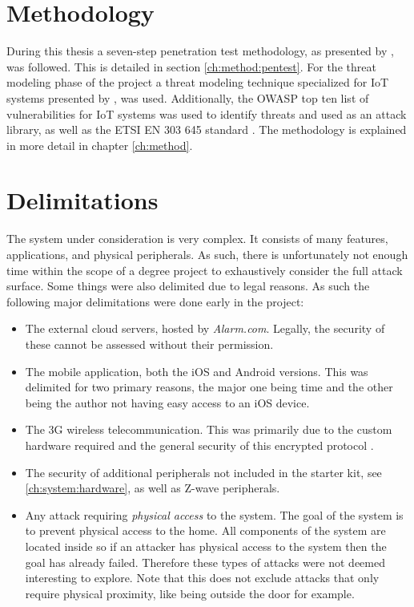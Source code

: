 \section{Methodology} \label{ch:intro:methodology}
During this thesis a seven-step penetration test methodology, as presented by \citeauthor{weidman2014} \cite{weidman2014}, was followed. This is detailed in section \ref{ch:method:pentest}. For the threat modeling phase of the project a threat modeling technique specialized for IoT systems presented by \citeauthor{guzman2017iot} \cite{guzman2017iot}, was used. Additionally, the OWASP top ten list of vulnerabilities for IoT systems \cite{owasp-iot-top10} was used to identify threats and used as an attack library, as well as the ETSI EN 303 645 standard \cite{etsi-iot-standard}. The methodology is explained in more detail in chapter \ref{ch:method}.

\section{Delimitations} \label{ch:intro:delimitations}
The system under consideration is very complex. It consists of many features, applications, and physical peripherals. As such, there is unfortunately not enough time within the scope of a degree project to exhaustively consider the full attack surface. Some things were also delimited due to legal reasons. As such the following major delimitations were done early in the project:
\begin{itemize}
    \item The external cloud servers, hosted by \textit{Alarm.com}. Legally, the security of these cannot be assessed without their permission.
    \item The mobile application, both the iOS and Android versions. This was delimited for two primary reasons, the major one being time and the other being the author not having easy access to an iOS device.
    \item The 3G wireless telecommunication. This was primarily due to the custom hardware required and the general security of this encrypted protocol \citeauthor{koien2003security}.
    \item The security of additional peripherals not included in the starter kit, see \ref{ch:system:hardware}, as well as Z-wave peripherals.
    \item Any attack requiring \textit{physical access} to the system. The goal of the system is to prevent physical access to the home. All components of the system are located inside so if an attacker has physical access to the system then the goal has already failed. Therefore these types of attacks were not deemed interesting to explore. Note that this does not exclude attacks that only require physical proximity, like being outside the door for example.
\end{itemize}

